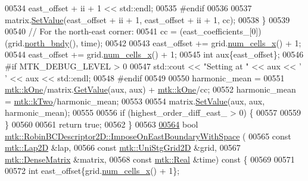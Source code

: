 \begin{DoxyCode}
00534       east\_offset + ii + 1 << std::endl;
00535 \textcolor{preprocessor}{    #endif}
00536 
00537     matrix.\hyperlink{classmtk_1_1DenseMatrix_a784ce5784109ac86bfb9d8562b334b13}{SetValue}(east\_offset + ii + 1, east\_offset + ii + 1, cc);
00538   \}
00539 
00540   \textcolor{comment}{// For the north-east corner:}
00541   cc = (east\_coefficients\_[0])(grid.\hyperlink{classmtk_1_1UniStgGrid2D_afe1ead253cdeb5503e0489eba8fd84e2}{north\_bndy}(), time);
00542 
00543   east\_offset += grid.\hyperlink{classmtk_1_1UniStgGrid2D_a2d182866a398aba8e4829590e85bf939}{num\_cells\_x}() + 1;
00544   east\_offset += grid.\hyperlink{classmtk_1_1UniStgGrid2D_a2d182866a398aba8e4829590e85bf939}{num\_cells\_x}() + 1;
00545   \textcolor{keywordtype}{int} aux\{east\_offset\};
00546 \textcolor{preprocessor}{  #if MTK\_DEBUG\_LEVEL > 0}
00547   std::cout << \textcolor{stringliteral}{"Setting at "} << aux << \textcolor{charliteral}{' '} << aux << std::endl;
00548 \textcolor{preprocessor}{  #endif}
00549 
00550   harmonic\_mean =
00551     \hyperlink{group__c01-roots_ga26407c24d43b6b95480943340d285c71}{mtk::kOne}/matrix.\hyperlink{classmtk_1_1DenseMatrix_a4b23ecbebd970b5eea915dbb50691024}{GetValue}(aux, aux) + \hyperlink{group__c01-roots_ga26407c24d43b6b95480943340d285c71}{mtk::kOne}/cc;
00552   harmonic\_mean = \hyperlink{group__c01-roots_gaf39c2d851a2db744f4feb1c5ab3ec2cf}{mtk::kTwo}/harmonic\_mean;
00553 
00554   matrix.\hyperlink{classmtk_1_1DenseMatrix_a784ce5784109ac86bfb9d8562b334b13}{SetValue}(aux, aux, harmonic\_mean);
00555 
00556   \textcolor{keywordflow}{if} (highest\_order\_diff\_east\_ > 0) \{
00557 
00559   \}
00560 
00561   \textcolor{keywordflow}{return} \textcolor{keyword}{true};
00562 \}
00563 
\hypertarget{mtk__robin__bc__descriptor__2d_8cc_source_l00564}{}\hyperlink{classmtk_1_1RobinBCDescriptor2D_a37efc8077bf5ea4f28539da248dc2a41}{00564} \textcolor{keywordtype}{bool} \hyperlink{classmtk_1_1RobinBCDescriptor2D_a37efc8077bf5ea4f28539da248dc2a41}{mtk::RobinBCDescriptor2D::ImposeOnEastBoundaryWithSpace}
      (
00565     \textcolor{keyword}{const} \hyperlink{classmtk_1_1Lap2D}{mtk::Lap2D} &lap,
00566     \textcolor{keyword}{const} \hyperlink{classmtk_1_1UniStgGrid2D}{mtk::UniStgGrid2D} &grid,
00567     \hyperlink{classmtk_1_1DenseMatrix}{mtk::DenseMatrix} &matrix,
00568     \textcolor{keyword}{const} \hyperlink{group__c01-roots_gac080bbbf5cbb5502c9f00405f894857d}{mtk::Real} &time)\textcolor{keyword}{ const }\{
00569 
00571 
00572   \textcolor{keywordtype}{int} east\_offset\{grid.\hyperlink{classmtk_1_1UniStgGrid2D_a2d182866a398aba8e4829590e85bf939}{num\_cells\_x}() + 1\};

\end{DoxyCode}

